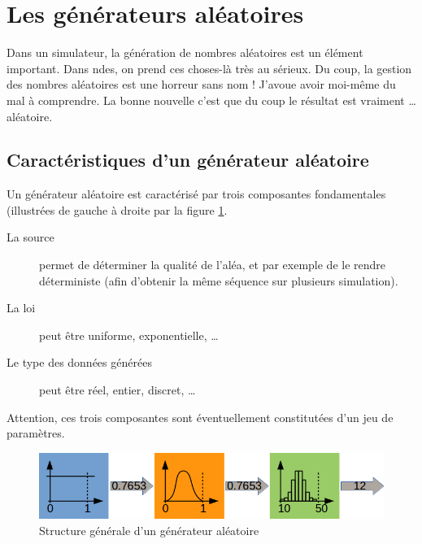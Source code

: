 %
\section{Les générateurs aléatoires}
\label{section:rand-gen}

   Dans un simulateur, la génération de nombres aléatoires est un
élément important. Dans {\sc ndes}, on prend ces choses-là très au
sérieux. Du coup, la gestion des nombres aléatoires est une horreur
sans nom ! J'avoue avoir moi-même du mal à comprendre. La bonne
nouvelle c'est que du coup le résultat est vraiment \ldots{}
aléatoire.

%
\subsection{Caractéristiques d'un générateur aléatoire}

   Un générateur aléatoire est caractérisé par trois composantes
fondamentales (illustrées de gauche à droite par la figure
\ref{figure:randomGenerator}.

\begin{description}
   \item[La source] permet de déterminer la qualité de l'aléa, et par
     exemple de le rendre déterministe (afin d'obtenir la même
     séquence sur plusieurs simulation).
   \item[La loi] peut être uniforme, exponentielle, \ldots
   \item[Le type des données générées] peut être réel, entier,
     discret, \ldots
\end{description}

   Attention, ces trois composantes sont éventuellement constitutées
d'un jeu de paramètres.

\begin{figure}[h]
\begin{center}
\includegraphics[width=\textwidth]{randomGenerator.png}
\caption{Structure générale d'un générateur aléatoire\label{figure:randomGenerator}}
\end{center}
\end{figure}

